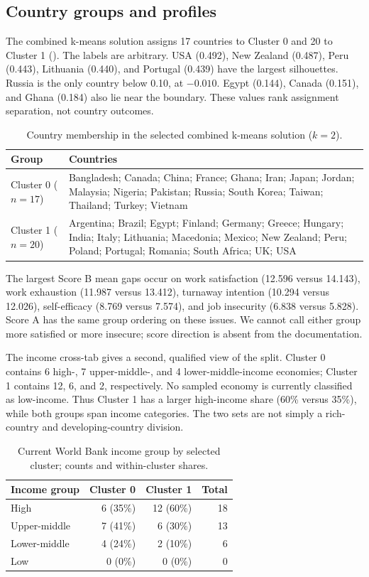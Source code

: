 \documentclass[9pt,twocolumn]{extarticle}
\begin{document}
\subsection{Country groups and profiles}
The combined k-means solution assigns 17 countries to Cluster 0 and 20 to Cluster 1 (). The labels are arbitrary. USA (0.492), New Zealand (0.487), Peru (0.443), Lithuania (0.440), and Portugal (0.439) have the largest silhouettes. Russia is the only country below 0.10, at $-0.010$. Egypt (0.144), Canada (0.151), and Ghana (0.184) also lie near the boundary. These values rank assignment separation, not country outcomes.

\begin{table}[t]
\centering
\caption{Country membership in the selected combined k-means solution ($k=2$).}
\label{tab:membership}
\small
\begin{tabular}{p{}p{}}
\toprule
Group & Countries \\
\midrule
Cluster 0 ($n=17$) & Bangladesh; Canada; China; France; Ghana; Iran; Japan; Jordan; Malaysia; Nigeria; Pakistan; Russia; South Korea; Taiwan; Thailand; Turkey; Vietnam \\
Cluster 1 ($n=20$) & Argentina; Brazil; Egypt; Finland; Germany; Greece; Hungary; India; Italy; Lithuania; Macedonia; Mexico; New Zealand; Peru; Poland; Portugal; Romania; South Africa; UK; USA \\
\bottomrule
\end{tabular}
\end{table}

The largest Score B mean gaps occur on work satisfaction (12.596 versus 14.143), work exhaustion (11.987 versus 13.412), turnaway intention (10.294 versus 12.026), self-efficacy (8.769 versus 7.574), and job insecurity (6.838 versus 5.828). Score A has the same group ordering on these issues. We cannot call either group more satisfied or more insecure; score direction is absent from the documentation.

The income cross-tab gives a second, qualified view of the split. Cluster 0 contains 6 high-, 7 upper-middle-, and 4 lower-middle-income economies; Cluster 1 contains 12, 6, and 2, respectively. No sampled economy is currently classified as low-income. Thus Cluster 1 has a larger high-income share (60\% versus 35\%), while both groups span income categories. The two sets are not simply a rich-country and developing-country division.

\begin{table}[t]
\centering
\caption{Current World Bank income group by selected cluster; counts and within-cluster shares.}
\label{tab:income}
\small
\begin{tabular}{lrrr}
\toprule
Income group & Cluster 0 & Cluster 1 & Total \\
\midrule
High & 6 (35\%) & 12 (60\%) & 18 \\
Upper-middle & 7 (41\%) & 6 (30\%) & 13 \\
Lower-middle & 4 (24\%) & 2 (10\%) & 6 \\
Low & 0 (0\%) & 0 (0\%) & 0 \\
\bottomrule
\end{tabular}
\end{table}
\end{document}
